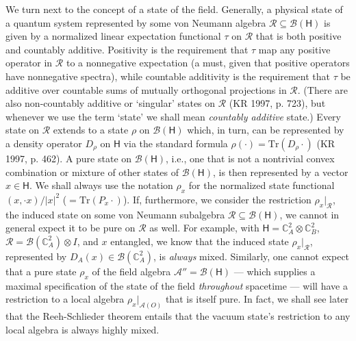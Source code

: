 \documentclass[12pt]{article}
\newcommand{\alg}[1]{\mbox{$\mathcal{#1}$}}
\newcommand{\hil}[1]{\mbox{$\mathsf{#1}$}}
\begin{document}
We turn next to the concept of a state of the field.  Generally, a 
physical state 
of a quantum system represented by some von Neumann algebra 
$\alg{R}\subseteq\alg{B}(\hil{H})$ is given 
by a normalized linear expectation functional $\tau$ on 
 $\alg{R}$ that is both positive and countably additive.  Positivity is 
the requirement that $\tau$ map any positive operator in $\alg{R}$ to a 
nonnegative expectation (a must, given that positive operators 
have nonnegative spectra), while countable additivity is the requirement that 
$\tau$ be additive over countable sums of mutually orthogonal 
projections in $\alg{R}$.  (There are 
also non-countably additive or `singular' states on $\alg{R}$ (KR 1997, p. 723), but 
whenever we use the term `state' we shall mean \emph{countably additive} state.)  
Every state on $\alg{R}$ extends to a  
state $\rho$ on $\alg{B}(\hil{H})$ which, in turn, can be represented by a 
density operator $D_{\rho}$ on $\hil{H}$ via the standard 
 formula $\rho(\cdot)=\mbox{Tr}(D_{\rho}\cdot)$ (KR 1997, p. 462).  
A pure state on $\alg{B}(\hil{H})$, i.e., one that is not a nontrivial convex combination or 
mixture 
of other states of $\alg{B}(\hil{H})$, is then represented by a vector 
$x\in\hil{H}$.  We shall always use the notation $\rho_{x}$ for the 
normalized state functional $(x,\cdot x)/|x|^{2}$ ($=\mbox{Tr}(P_{x}\cdot)$).  
If, furthermore, we consider the 
restriction $\rho_{x}|_{\alg{R}}$, the induced state on some von 
Neumann subalgebra $\alg{R}\subseteq\alg{B}(\hil{H})$, we cannot 
in general 
expect it to be pure on $\alg{R}$ as well.  For example, with $\hil{H}=\mathbb{C}_{A}^{2}\otimes 
\mathbb{C}_{B}^{2}$, $\alg{R}=\alg{B}(\mathbb{C}_{A}^{2})\otimes I$, and $x$ 
entangled, we know that the induced state $\rho_{x}|_{\alg{R}}$, represented 
by $D_{A}(x)\in\alg{B}(\mathbb{C}_{A}^{2})$, is 
\emph{always} mixed.  Similarly, one cannot expect that 
a pure state $\rho_{x}$ of the field algebra 
$\alg{A}''=\alg{B}(\hil{H})$ --- which supplies a maximal 
specification of the state of the 
field \emph{throughout} spacetime --- will have a restriction to a 
local algebra $\rho_{x}|_{\alg{A}(O)}$ that is itself pure.  In fact, 
we shall see later that the Reeh-Schlieder theorem entails that the vacuum 
state's restriction to any local algebra is always highly mixed.
\end{document}
